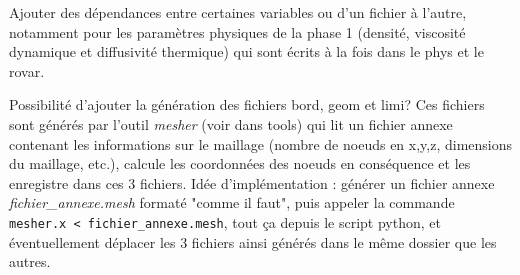 \documentclass{article} %
\begin{document}
Ajouter des dépendances entre certaines variables ou d'un fichier à l'autre, notamment pour les paramètres physiques de la phase 1 (densité, viscosité dynamique et diffusivité thermique) qui sont écrits à la fois dans le phys et le rovar.

Possibilité d'ajouter la génération des fichiers bord, geom et limi? Ces fichiers sont générés par l'outil \textit{mesher} (voir dans tools) qui lit un fichier annexe contenant les informations sur le maillage (nombre de noeuds en x,y,z, dimensions du maillage, etc.), calcule les coordonnées des noeuds en conséquence et les enregistre dans ces 3 fichiers. Idée d'implémentation : générer un fichier annexe \textit{fichier\_annexe.mesh} formaté "comme il faut", puis appeler la commande \texttt{mesher.x < fichier\_annexe.mesh}, tout ça depuis le script python, et éventuellement déplacer les 3 fichiers ainsi générés dans le même dossier que les autres.
\end{document}
